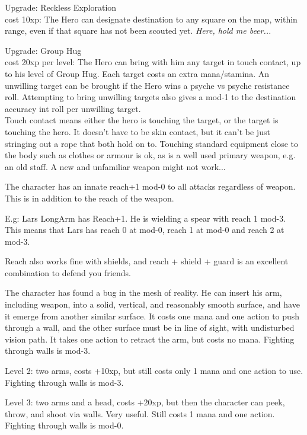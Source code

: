 Upgrade: Reckless Exploration\\
cost 10xp: The Hero can designate destination to any square on the map, within range, even if that square has not been scouted yet. \emph{Here, hold me beer...}

Upgrade: Group Hug\\
cost 20xp per level: The Hero can bring with him any target in touch contact, up to his level of Group Hug. Each target costs an extra mana/stamina. An unwilling target can be brought if the Hero wins a psyche vs psyche resistance roll. Attempting to bring unwilling targets also gives a mod-1 to the destination accuracy int roll per unwilling target.\\
Touch contact means either the hero is touching the target, or the target is touching the hero. It doesn't have to be skin contact, but it can't be just stringing out a rope that both hold on to. Touching standard equipment close to the body such as clothes or armour is ok, as is a well used primary weapon, e.g. an old staff. A new and unfamiliar weapon might not work...


 The character has an innate reach+1 mod-0 to all attacks regardless of weapon. This is in addition to the reach of the weapon.

E.g: Lars LongArm has Reach+1. He is wielding a spear with reach 1 mod-3. This means that Lars has reach 0 at mod-0, reach 1 at mod-0 and reach 2 at mod-3.

Reach also works fine with shields, and reach + shield + guard is an excellent combination to defend you friends.


 The character has found a bug in the mesh of reality. He can insert his arm, including weapon, into a solid, vertical, and reasonably smooth surface, and have it emerge from another similar surface. It costs one mana and one action to push through a wall, and the other surface must be in line of sight, with undisturbed vision path. It takes one action to retract the arm, but costs no mana. Fighting through walls is mod-3.

Level 2: two arms, costs +10xp, but still costs only 1 mana and one action to use. Fighting through walls is mod-3.

Level 3: two arms and a head, costs +20xp, but then the character can peek, throw, and shoot via walls. Very useful. Still costs 1 mana and one action. Fighting through walls is mod-0.

